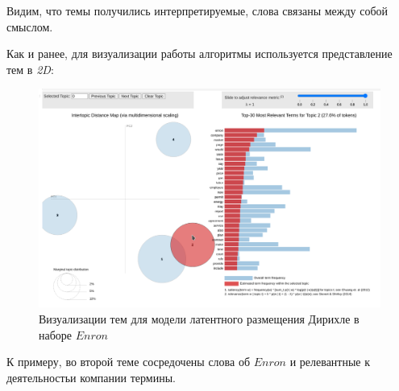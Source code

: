 Видим, что темы получились интерпретируемые, слова связаны между собой смыслом.

Как и ранее, для визуализации работы алгоритмы используется представление тем в
\textit{2D}:

\begin{figure}[H]
\centering
\includegraphics[scale=0.5]{pics/enron-lda-2d.png}
\caption{Визуализации тем для модели латентного размещения Дирихле в наборе $Enron$}
\end{figure}

К примеру, во второй теме сосредочены слова об $Enron$ и релевантные к деятельностьи компании термины.

